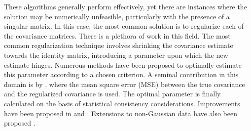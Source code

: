 \documentclass{article}
\theoremstyle{plain}
\theoremstyle{definition}
\theoremstyle{remark}
\begin{document}
These algorithms generally perform effectively, yet there are instances where the solution may be numerically unfeasible, particularly with the presence of a singular matrix. In this case, the most common solution is to regularize each of the covariance matrices. There is a plethora of work in this field.  The most common regularization technique involves shrinking the covariance estimate towards the identity matrix, introducing a parameter upon which the new estimate hinges. Numerous methods have been proposed to optimally estimate this parameter according to a chosen criterion.  A seminal contribution in this domain is by \cite{ledoit2004well}, where the mean square error (MSE) between the true covariance and the regularized covariance is used. The optimal parameter is finally calculated on the basis of statistical consistency considerations. Improvements have been proposed in \cite{ledoit2015spectrum} and \cite{ledoit2020analytical}. Extensions to non-Gaussian data have also been proposed \cite{ollila2014regularized,pascal2014regularized}.

\end{document}
